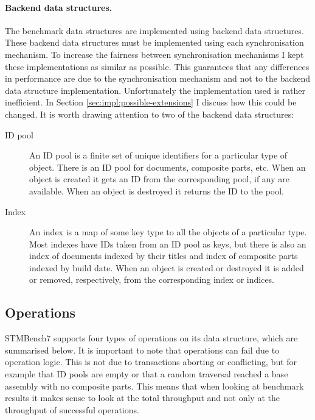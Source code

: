 \documentclass[12pt,a4paper,oneside,openright]{report}
\begin{document}
\paragraph{Backend data structures.} The benchmark data structures
are implemented using backend data structures. These backend data
structures must be implemented using each synchronisation
mechanism. To increase the fairness between synchronisation mechanisms
I kept these implementations as similar as possible. This guarantees
that any differences in performance are due to the synchronisation
mechanism and not to the backend data structure
implementation. Unfortunately the implementation used is rather
inefficient. In Section \ref{sec:impl:possible-extensions} I discuss
how this could be changed. It is worth drawing attention to two of the
backend data structures:

\begin{description}
\item[ID pool] An ID pool is a finite set of unique identifiers for a
  particular type of object. There is an ID pool for documents,
  composite parts, etc. When an object is created it gets an ID from
  the corresponding pool, if any are available. When an object is
  destroyed it returns the ID to the pool.
\item[Index] An index is a map of some key type to all the objects of
  a particular type. Most indexes have IDs taken from an ID pool as
  keys, but there is also an index of documents indexed by their
  titles and index of composite parts indexed by build date. When an
  object is created or destroyed it is added or removed, respectively,
  from the corresponding index or indices.
\end{description}

\subsection{Operations}
\label{sec:impl:operations}

STMBench7 supports four types of operations on its data structure,
which are summarised below. It is important to note that operations
can fail due to operation logic. This is not due to transactions aborting
or conflicting, but for example that ID pools are empty or that a
random traversal reached a base assembly with no composite parts. This
means that when looking at benchmark results it makes sense to look at
the total throughput and not only at the throughput of successful
operations.
\end{document}
